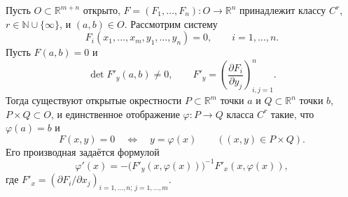 \label{definition:07}

\begin{theorem}
Пусть $O\subset\mathbb R^{m+n}$ открыто, $F=(F_1,\ldots,F_n):O\to\mathbb R^n$ принадлежит классу $C^r$, $r\in\mathbb N\cup\{\infty\}$, и $(a,b)\in O$.
Рассмотрим систему
\[
  F_i(x_1,\ldots,x_m,y_1,\ldots,y_n)=0,
  \qquad i=1,\ldots,n.
\]
Пусть $F(a,b)=0$ и
\[
  \det F'_y(a,b)\ne0,
  \qquad F'_y=\left(\frac{\partial F_i}{\partial y_j}\right)_{i,j=1}^{n}.
\]
Тогда существуют открытые окрестности $P\subset\mathbb R^m$ точки $a$ и $Q\subset\mathbb R^n$ точки $b$, $P\times Q\subset O$, и единственное отображение $\varphi:P\to Q$ класса $C^r$ такие, что $\varphi(a)=b$ и
\[
  F(x,y)=0\quad\Longleftrightarrow\quad y=\varphi(x)
  \qquad ((x,y)\in P\times Q).
\]
Его производная задаётся формулой
\[
  \varphi'(x)=
  -\bigl(F'_y(x,\varphi(x))\bigr)^{-1}F'_x(x,\varphi(x)),
\]
где $F'_x=(\partial F_i/\partial x_j)_{i=1,\ldots,n;\,j=1,\ldots,m}$.
\end{theorem}
